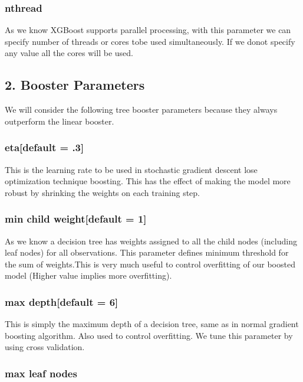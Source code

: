 \subsubsection{nthread} 

As we know XGBoost supports parallel processing, with this parameter we can
specify number of threads or cores tobe used simultaneously. If we donot specify
any value  all the cores will be used.

\subsection{2. Booster Parameters} 

We will consider the following tree booster parameters because they always
outperform  the linear booster.

\subsubsection{eta[default = .3]} 

This is the learning rate to be used in stochastic gradient descent lose
optimization  technique boosting. This has the effect of making the model more
robust by shrinking the  weights on each training step.

\subsubsection{min child weight[default = 1]} 

As we know a decision tree has weights assigned to all the child nodes
(including leaf nodes) for all observations. This parameter defines minimum
threshold for the sum of  weights.This is very much useful to control
overfitting of our boosted model  (Higher  value implies more overfitting).

\subsubsection{max depth[default = 6]} 

This is simply the maximum depth of a decision tree, same as in normal gradient
boosting  algorithm. Also used to control overfitting. We tune this parameter by
using cross validation.

\subsubsection{max leaf nodes}


